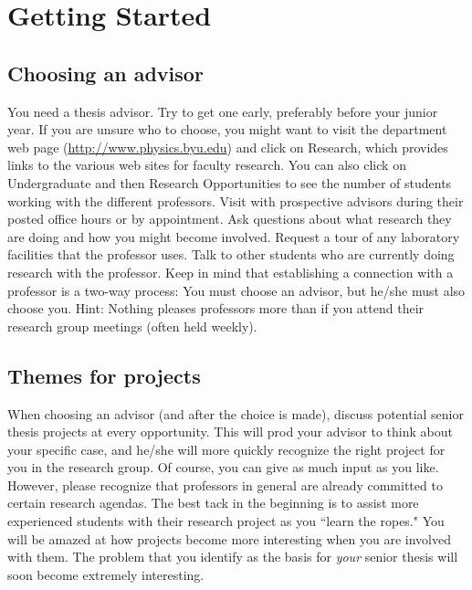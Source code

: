 \chapter{Getting Started}
\label{chap:GettingStarted}

\section{Choosing an advisor}
\label{sec:ChoosingAdvisor} 

You need a thesis advisor. Try to get one early, preferably before
your junior year. If you are unsure who to choose, you might want to
visit the department web page
(\href{http://www.physics.byu.edu/}{\url{http://www.physics.byu.edu}}) and click
on Research, which provides links to the various web sites for
faculty research. You can also click on Undergraduate and then
Research Opportunities to see the number of students working with
the different professors. Visit with prospective advisors during
their posted office hours or by appointment. Ask questions about
what research they are doing and how you might become involved.
Request a tour of any laboratory facilities that the professor uses.
Talk to other students who are currently doing research with the
professor. Keep in mind that establishing a connection with a
professor is a two-way process: You must choose an advisor, but
he/she must also choose you. Hint: Nothing pleases professors more
than if you attend their research group meetings (often held
weekly).

\section{Themes for projects}
\label{sec:ProjectThemes} 

When choosing an advisor (and after the choice is made), discuss
potential senior thesis projects at every opportunity. This will
prod your advisor to think about your specific case, and he/she will
more quickly recognize the right project for you in the research
group. Of course, you can give as much input as you like. However,
please recognize that professors in general are already committed to
certain research agendas. The best tack in the beginning is to
assist more experienced students with their research project as you
``learn the ropes." You will be amazed at how projects become more
interesting when you are involved with them. The problem that you
identify as the basis for \emph{your} senior thesis will soon become
extremely interesting.

